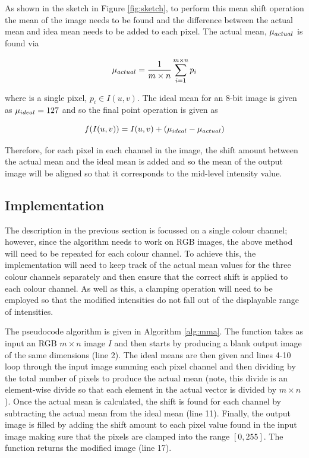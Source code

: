 \documentclass[journal,transmag]{IEEEtran}
\begin{document}
As shown in the sketch in Figure \ref{fig:sketch}, to perform this mean shift operation the mean of the image needs to be found and the difference between the actual mean and idea mean needs to be added to each pixel.  The actual mean, $\mu_{\mbox{\tiny{actual}}}$ is found via

\begin{equation}
	\mu_{\mbox{\tiny{actual}}} = \frac{1}{m \times n}\sum_{i=1}^{m \times n} p_{i}
\end{equation}

\noindent where is a single pixel, $p_{i} \in I(u, v)$.  The ideal mean for an $8$-bit image is given as $\mu_{\mbox{\tiny{ideal}}} = 127$ and so the final point operation is given as

\begin{equation}
	f(I(u, v)) = I(u, v) + (\mu_{\mbox{\tiny{ideal}}} - \mu_{\mbox{\tiny{actual}}})
\end{equation}

Therefore, for each pixel in each channel in the image, the shift amount between the actual mean and the ideal mean is added and so the mean of the output image will be aligned so that it corresponds to the mid-level intensity value.

\subsection{Implementation}

The description in the previous section is focussed on a single colour channel; however, since the algorithm needs to work on RGB images, the above method will need to be repeated for each colour channel.  To achieve this, the implementation will need to keep track of the actual mean values for the three colour channels separately and then ensure that the correct shift is applied to each colour channel.  As well as this, a clamping operation will need to be employed so that the modified intensities do not fall out of the displayable range of intensities.

The pseudocode algorithm is given in Algorithm \ref{alg:mma}.  The function takes as input an RGB $m \times n$ image $I$ and then starts by producing a blank output image of the same dimensions (line 2).  The ideal means are then given and lines 4-10 loop through the input image summing each pixel channel and then dividing by the total number of pixels to produce the actual mean (note, this divide is an element-wise divide so that each element in the actual vector is divided by $m \times n$).   Once the actual mean is calculated, the shift is found for each channel by subtracting the actual mean from the ideal mean (line 11).  Finally, the output image is filled by adding the shift amount to each pixel value found in the input image making sure that the pixels are clamped into the range $[0,255]$.  The function returns the modified image (line 17).
\end{document}
